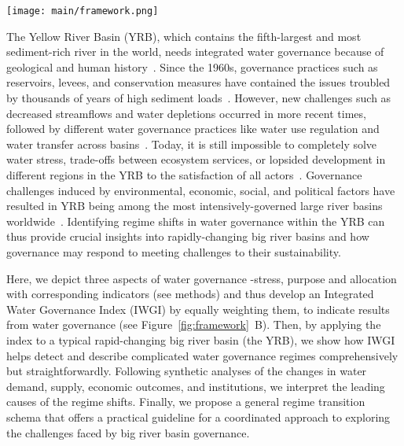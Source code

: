 \documentclass[draft]{../agujournal2019}
\begin{document}
\begin{figure*}[!ht]
	\centerline{
		\texttt{[image: main/framework.png]}
	}
	\caption{
		\textbf{A.} Identifying the water governance regimes in transitions of a hydrosocial cycle with an integrated water governance index (IWGI). Water stress (S), purposes of water services (P), and water allocation (A) are three aspects to be considered.
		For example, reservoir construction ( and ) can relieve local water stress; The development of intensive irrigated agriculture () and growth of energy industrial demand () will change the purpose of water use; The water delivery system controls water allocation ( and ) within the basin system.
		\textbf{B.} Therefore, the methodology is to combine three aspects' corresponding indicators, and then an abrupt change of the IWGI can indicate a regime shift in water governance.
	}\label{fig:framework}
\end{figure*}


The Yellow River Basin (YRB), which contains the fifth-largest and most sediment-rich river in the world, needs integrated water governance because of geological and human history~\cite{mostern2021,best2019}.
Since the 1960s, governance practices such as reservoirs, levees, and conservation measures have contained the issues troubled by thousands of years of high sediment loads~\cite{wang2016a,song2020}.
However, new challenges such as decreased streamflows and water depletions occurred in more recent times, followed by different water governance practices like water use regulation and water transfer across basins~\cite{wang2019c}.
Today, it is still impossible to completely solve water stress, trade-offs between ecosystem services, or lopsided development in different regions in the YRB to the satisfaction of all actors~\cite{wohlfart2016}.
Governance challenges induced by environmental, economic, social, and political factors have resulted in YRB being among the most intensively-governed large river basins worldwide~\cite{nickum2021}.
Identifying regime shifts in water governance within the YRB can thus provide crucial insights into rapidly-changing big river basins and how governance may respond to meeting challenges to their sustainability.

Here, we depict three aspects of water governance -stress, purpose and allocation with corresponding indicators (see methods) and thus develop an Integrated Water Governance Index (IWGI) by equally weighting them, to indicate results from water governance (see Figure~\ref{fig:framework}~B).
Then, by applying the index to a typical rapid-changing big river basin (the YRB), we show how IWGI helps detect and describe complicated water governance regimes comprehensively but straightforwardly.
Following synthetic analyses of the changes in water demand, supply, economic outcomes, and institutions, we interpret the leading causes of the regime shifts.
Finally, we propose a general regime transition schema that offers a practical guideline for a coordinated approach to exploring the challenges faced by big river basin governance.
\end{document}
